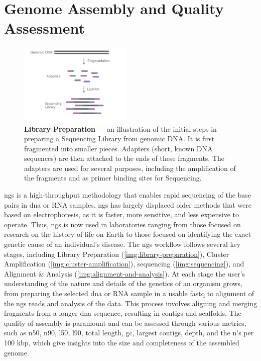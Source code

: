 \section{Genome Assembly and Quality Assessment}

\begin{figure}
  \centering
  \includegraphics[width=0.48\textwidth]{resources/images/Library Preparation.png}
  \caption{\textbf{Library Preparation} \cite{Illumina2017-LP} — an illustration of the initial steps in preparing a Sequencing Library from genomic DNA. It is first fragmented into smaller pieces. Adapters (short, known DNA sequences) are then attached to the ends of these fragments. The adapters are used for several purposes, including the amplification of the fragments and as primer binding sites for Sequencing.}
  \label{img:library-preparation}
\end{figure}

\gls{ngs} is a high-throughput methodology that enables rapid \gls{sequencing} of the base pairs in \gls{dna} or RNA samples. \gls{ngs} has largely displaced older methods that were based on electrophoresis, as it is faster, more sensitive, and less expensive to operate. Thus, \gls{ngs} is now used in laboratories ranging from those focused on research on the history of life on Earth to those focused on identifying the exact genetic cause of an individual's disease. The \gls{ngs} workflow follows several key stages, including Library Preparation (\autoref{img:library-preparation}), Cluster Amplification (\autoref{img:cluster-amplification}), \gls{sequencing} (\autoref{img:sequencing}), and Alignment \& Analysis (\autoref{img:alignment-and-analysis}). At each stage the user's understanding of the nature and details of the genetics of an organism grows, from preparing the selected \gls{dna} or RNA sample in a usable \gls{fastq} \cite{Buffalo2015} to alignment of the \gls{ngs} \gls{read}s and analysis of the data. This process involves aligning and merging fragments from a longer \gls{dna} sequence, resulting in \gls{contig}s and \gls{scaffold}s. The quality of \gls{assembly} is paramount and can be assessed through various \gls{metrics}, such as \gls{n50}, \gls{n90}, \gls{l50}, \gls{l90}, \gls{total length}, \gls{gc}, \gls{largest contigs}, \gls{depth}, and the \gls{n's per 100 kbp}, which give insights into the size and completeness of the assembled \gls{genome}.

